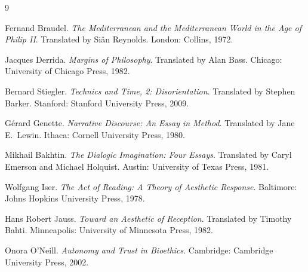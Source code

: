 \documentclass[12pt,a4paper]{article}
\begin{document}

\begin{thebibliography}{9}

Fernand Braudel.
\newblock \emph{The Mediterranean and the Mediterranean World in the Age of Philip II}.
\newblock Translated by Si\^{a}n Reynolds. London: Collins, 1972.

Jacques Derrida.
\newblock \emph{Margins of Philosophy}.
\newblock Translated by Alan Bass. Chicago: University of Chicago Press, 1982.

Bernard Stiegler.
\newblock \emph{Technics and Time, 2: Disorientation}.
\newblock Translated by Stephen Barker. Stanford: Stanford University Press, 2009.

G\'erard Genette.
\newblock \emph{Narrative Discourse: An Essay in Method}.
\newblock Translated by Jane E.\ Lewin. Ithaca: Cornell University Press, 1980.

Mikhail Bakhtin.
\newblock \emph{The Dialogic Imagination: Four Essays}.
\newblock Translated by Caryl Emerson and Michael Holquist. Austin: University of Texas Press, 1981.

Wolfgang Iser.
\newblock \emph{The Act of Reading: A Theory of Aesthetic Response}.
\newblock Baltimore: Johns Hopkins University Press, 1978.

Hans Robert Jauss.
\newblock \emph{Toward an Aesthetic of Reception}.
\newblock Translated by Timothy Bahti. Minneapolis: University of Minnesota Press, 1982.

Onora O'Neill.
\newblock \emph{Autonomy and Trust in Bioethics}.
\newblock Cambridge: Cambridge University Press, 2002.

\end{thebibliography}
\end{document}
